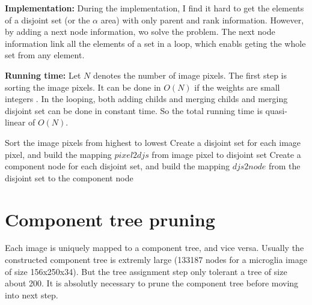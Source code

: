 \textbf{Implementation: } During the implementation, I find it hard to get the elements of a disjoint set (or the $\alpha$ area) with only parent and rank information. However, by adding a next node information, wo solve the problem. The next node information link all the elements of a set in a loop, which enabls geting the whole set from any element.

\textbf{Running time: } Let $N$ denotes the number of image pixels. The first step is sorting the image pixels. It can be done in $O(N)$ if the weights are small integers \cite{cormen2001introduction}. In the looping, both adding childs and merging childs and merging disjoint set can be done in constant time. So the total running time is quasi-linear of $O(N)$.

\begin{algorithm}[H]
\SetAlgoLined
{}
Sort the image pixels from highest to lowest\;
Create a disjoint set for each image pixel, and build the mapping $pixel2djs$ from image pixel to disjoint set\;
Create a component node for each disjoint set, and build the mapping $djs2node$ from the disjoint set to the component node\;

\end{algorithm}

\section{Component tree pruning}
Each image is uniquely mapped to a component tree, and vice versa. Usually the constructed component tree is extremly large (133187 nodes for a microglia image of size 156x250x34). But the tree assignment step only tolerant a tree of size about 200. It is absolutly necessary to prune the component tree before moving into next step.\\
